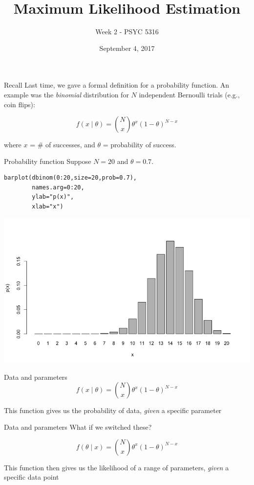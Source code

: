 \documentclass[presentation]{beamer}
\author{Week 2 - PSYC 5316}
\date{September 4, 2017}
\title{Maximum Likelihood Estimation}
\begin{document}
\maketitle

\begin{frame}[label=sec-1]{Recall}
Last time, we gave a formal definition for a \alert{probability function}.  An example was the \emph{binomial} distribution for $N$ independent Bernoulli trials (e.g., coin flips):

\[
f(x\mid \theta) = {N\choose x} \theta^x(1-\theta)^{N-x}
\]

where $x$ = \# of successes, and $\theta$ = probability of success.
\end{frame}

\begin{frame}[fragile,label=sec-2]{Probability function}
 Suppose $N=20$ and $\theta=0.7$.  

\begin{verbatim}
barplot(dbinom(0:20,size=20,prob=0.7),
        names.arg=0:20,
        ylab="p(x)",
        xlab="x")
\end{verbatim}

\includegraphics[width=.9\linewidth]{figures/week2/binom.png}
\end{frame}

\begin{frame}[label=sec-3]{Data and parameters}
\[
f(x\mid \theta) = {N\choose x} \theta^x(1-\theta)^{N-x}
\]

\vspace{1cm}

This function gives us the probability of \alert{data}, \emph{given} a specific \alert{parameter}
\end{frame}

\begin{frame}[label=sec-4]{Data and parameters}
What if we switched these?

\[
f(\theta \mid x) = {N\choose x} \theta^x(1-\theta)^{N-x}
\]

\vspace{1cm}

This function then gives us the likelihood of a range of \alert{parameters}, \emph{given} a specific \alert{data point}
\end{frame}
\end{document}
